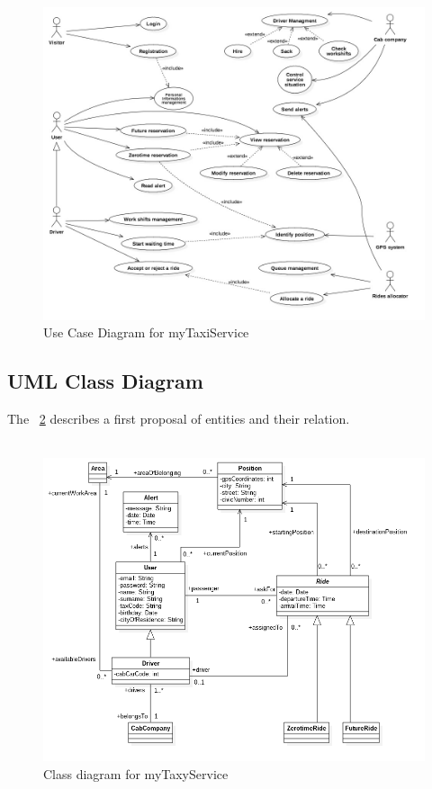 \begin{figure}
	\centerline{\includegraphics[width=\paperwidth]{./figures/UseCaseDiagram.jpg}}
	\caption{Use Case Diagram for myTaxiService}
	\label{ucDia}
\end{figure}

\clearpage

\subsection{UML Class Diagram}
The \figurename~\ref{cDia} describes a first proposal of entities and their relation.\\
\\

\begin{figure}[h!]
	\centerline{\includegraphics[width=\paperwidth]{./figures/ClassDiagram.png}}
	\caption{Class diagram for myTaxyService}
	\label{cDia}
\end{figure}

